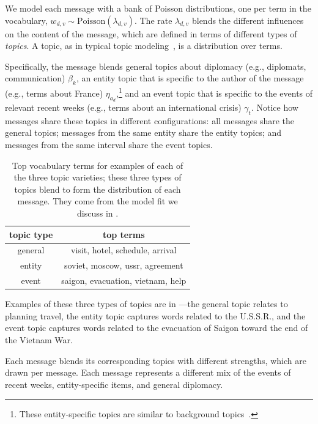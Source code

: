We model each message with a bank of Poisson distributions, one per
term in the vocabulary, $w_{d,v} \sim \textrm{Poisson}(\lambda_{d,v})$.
The rate $\lambda_{d,v}$ blends the different influences on the
content of the message, which are defined in terms of different types
of \textit{topics}. A topic, as in typical topic modeling~\cite{Blei:2003,canny2004gap,Gopalan:2014b}, is
a distribution over terms.



Specifically, the message blends general topics about diplomacy (e.g.,
diplomats, communication) $\beta_k$, an entity topic that is specific
to the author of the message (e.g., terms about France) $\eta_{a_d}$,\footnote{These entity-specific topics are similar to background topics~\cite{paul2012model}.}
and an event topic that is specific to the events of relevant recent weeks (e.g.,
terms about an international crisis) $\gamma_t$. Notice how messages
share these topics in different configurations: all messages share the
general topics; messages from the same entity share the entity topics;
and messages from the same interval share the event topics.

\begin{table}
\centering
\small
\begin{tabular}{cc}
\toprule
topic type & top terms \\
\midrule
general & visit, hotel, schedule, arrival \\
entity & soviet, moscow, ussr, agreement \\
event & saigon, evacuation, vietnam, help \\
\bottomrule
\end{tabular}
\caption{Top vocabulary terms for examples of each of the three topic varieties; these three types of topics blend to form the distribution of each message.  They come from the model fit we discuss in .}
\label{tab:3topics}
\end{table}

Examples of these three types of topics are in ---the general topic
relates to planning travel, the entity topic captures words related to the U.S.S.R., and
the event topic captures words related to the evacuation of Saigon toward the end of the Vietnam War.

Each message blends its corresponding topics with different
strengths, which are drawn per message. Each message represents a
different mix of the events of recent weeks, entity-specific items, and
general diplomacy.

